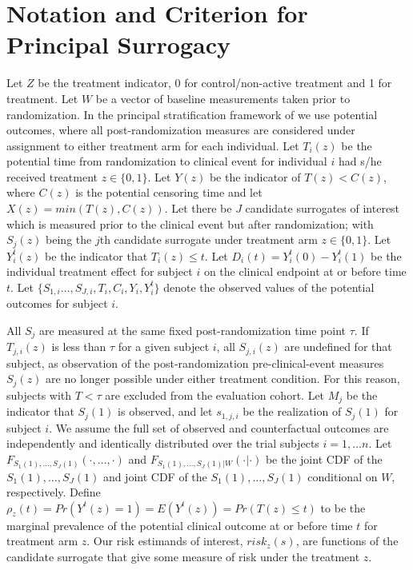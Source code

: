 \documentclass[times, doublespace]{simauth}
\begin{document}
\section{Notation and Criterion for Principal Surrogacy} \label{DEF}
Let $Z$ be the treatment indicator, 0 for control/non-active treatment and 1 for treatment. Let $W$ be a vector of baseline measurements taken prior to randomization. In the principal stratification framework of \citet{Frangakis02} we use potential outcomes, where all post-randomization measures are considered under assignment to either treatment arm for each individual. Let $T_i(z)$ be the potential time from randomization to clinical event for individual $i$ had s/he received treatment $z\in \{0,1\}$. Let $Y(z)$ be the indicator of $T(z)<C(z)$, where $C(z)$ is the potential censoring time and let $X(z)=min(T(z),C(z))$. Let there be $J$ candidate surrogates of interest which is measured prior to the clinical event but after randomization; with $S_{j}(z)$ being the $j$th candidate surrogate under treatment arm $z\in \{0,1\}$. Let $Y_{i}^{t}(z)$ be the indicator that $T_i(z)\leq t$. Let $D_i(t)=Y_{i}^{t}(0)-Y_{i}^{t}(1)$ be the individual treatment effect for subject $i$ on the clinical endpoint at or before time $t$. Let $\{S_{1,i}\ldots,S_{J,i}, T_i, C_i, Y_i, Y_{i}^{t} \}$ denote the observed values of the potential outcomes for subject $i$. 

All $S_j$ are measured at the same fixed post-randomization time point $\tau$. If $T_{j,i}(z)$ is less than $\tau$ for a given subject $i$, all $S_{j,i}(z)$ are undefined for that subject, as observation of the post-randomization pre-clinical-event measures $S_{j}(z)$ are no longer possible under either treatment condition. For this reason, subjects with $T< \tau$ are excluded from the evaluation cohort. Let $M_j$ be the indicator that $S_{j}(1)$ is observed, and let $s_{1,j,i}$ be the realization of $S_{j}(1)$ for subject $i$. We assume the full set of observed and counterfactual outcomes are independently and identically distributed over the trial subjects $i= 1, \ldots n$. Let $F_{S_1(1), \ldots, S_J(1)}(\cdot,\dots,\cdot)$ and $F_{S_1(1), \ldots, S_J(1)|W}(\cdot|\cdot)$ be the joint CDF of the $S_1(1), \ldots, S_J(1)$ and joint CDF of the $S_1(1), \ldots, S_J(1)$ conditional on $W$, respectively. Define $\rho_z(t)=Pr(Y^t(z)=1)=E(Y^t(z))=Pr(T(z)\leq t)$ to be the marginal prevalence of the potential clinical outcome at or before time $t$ for treatment arm $z$. Our risk estimands of interest, $risk_z(s)$, are functions of the candidate surrogate that give some measure of risk under the treatment $z$. 
\end{document}

